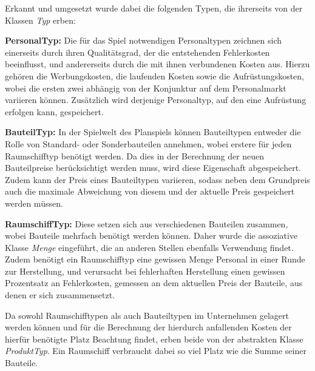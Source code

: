 Erkannt und umgesetzt wurde dabei die folgenden Typen, die ihrerseits von der Klassen \textit{Typ} erben:
\begin{seList}
\item \textbf{PersonalTyp:} Die für das Spiel notwendigen Personaltypen zeichnen sich einerseits durch ihren Qualitätsgrad, der die entstehenden Fehlerkosten beeinflusst, und andererseits durch die mit ihnen verbundenen Kosten aus. Hierzu gehören die Werbungskosten, die laufenden Kosten sowie die Aufrüstungskosten, wobei die ersten zwei abhängig von der Konjunktur auf dem Personalmarkt variieren können. Zusätzlich wird derjenige Personaltyp, auf den eine Aufrüstung erfolgen kann, gespeichert.
\item \textbf{BauteilTyp:} In der Spielwelt des Planspiels können Bauteiltypen entweder die Rolle von Standard- oder Sonderbauteilen annehmen, wobei erstere für jeden Raumschifftyp benötigt werden. Da dies in der Berechnung der neuen Bauteilpreise berücksichtigt werden muss, wird diese Eigenschaft abgespeichert. Zudem kann der Preis eines Bauteiltypen variieren, sodass neben dem Grundpreis auch die maximale Abweichung von diesem und der aktuelle Preis gespeichert werden müssen.
\item \textbf{RaumschiffTyp:} Diese setzen sich aus verschiedenen Bauteilen zusammen, wobei Bauteile mehrfach benötigt werden können. Daher wurde die assoziative Klasse \textit{Menge} eingeführt, die an anderen Stellen ebenfalls Verwendung findet. Zudem benötigt ein Raumschifftyp eine gewissen Menge Personal in einer Runde zur Herstellung, und verursacht bei fehlerhaften Herstellung einen gewissen Prozentsatz an Fehlerkosten, gemessen an dem aktuellen Preis der Bauteile, aus denen er sich zusammensetzt.
\end{seList}

Da sowohl Raumschifftypen als auch Bauteiltypen im Unternehmen gelagert werden können und für die Berechnung der hierdurch anfallenden Kosten der hierfür benötigte Platz Beachtung findet, erben beide von der abstrakten Klasse \textit{ProduktTyp}. Ein Raumschiff verbraucht dabei so viel Platz wie die Summe seiner Bauteile.

